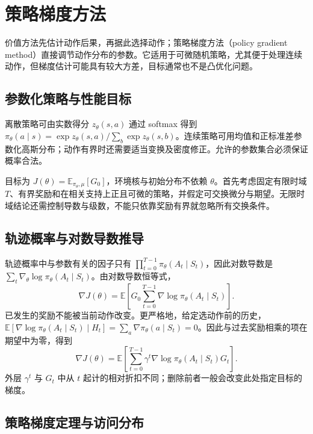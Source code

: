 \setcounter{chapter}{13} %
\chapter{策略梯度方法}
\label{ch:rl-policy-gradient}

价值方法先估计动作后果，再据此选择动作；策略梯度方法（policy gradient method）直接调节动作分布的参数。它适用于可微随机策略，尤其便于处理连续动作，但梯度估计可能具有较大方差，目标通常也不是凸优化问题。

\section{参数化策略与性能目标}

离散策略可由实数得分 $z_\theta(s,a)$ 通过 softmax 得到 $\pi_\theta(a\mid s)=\exp z_\theta(s,a)/\sum_b\exp z_\theta(s,b)$。连续策略可用均值和正标准差参数化高斯分布；动作有界时还需要适当变换及密度修正。允许的参数集合必须保证概率合法。

目标为 $J(\theta)=\mathbb E_{\pi_\theta,\mu}[G_0]$，环境核与初始分布不依赖 $\theta$。首先考虑固定有限时域 $T$、有界奖励和在相关支持上正且可微的策略，并假定可交换微分与期望。无限时域结论还需控制导数与级数，不能只依靠奖励有界就忽略所有交换条件。

\section{轨迹概率与对数导数推导}

轨迹概率中与参数有关的因子只有 $\prod_{t=0}^{T-1}\pi_\theta(A_t\mid S_t)$，因此对数导数是 $\sum_t\nabla_\theta\log\pi_\theta(A_t\mid S_t)$。由对数导数恒等式，
\[
\nabla J(\theta)=\mathbb E\!\left[G_0\sum_{t=0}^{T-1}\nabla\log\pi_\theta(A_t\mid S_t)\right].
\]
已发生的奖励不能被当前动作改变。更严格地，给定选动作前的历史，$\mathbb E[\nabla\log\pi_\theta(A_t\mid S_t)\mid H_t]=\sum_a\nabla\pi_\theta(a\mid S_t)=0$。因此与过去奖励相乘的项在期望中为零，得到
\begin{equation}
\nabla J(\theta)=\mathbb E\!\left[\sum_{t=0}^{T-1}\gamma^t\nabla\log\pi_\theta(A_t\mid S_t)G_t\right].
\label{eq:rl-reinforce-gradient}
\end{equation}
外层 $\gamma^t$ 与 $G_t$ 中从 $t$ 起计的相对折扣不同；删除前者一般会改变此处指定目标的梯度。

\section{策略梯度定理与访问分布}

